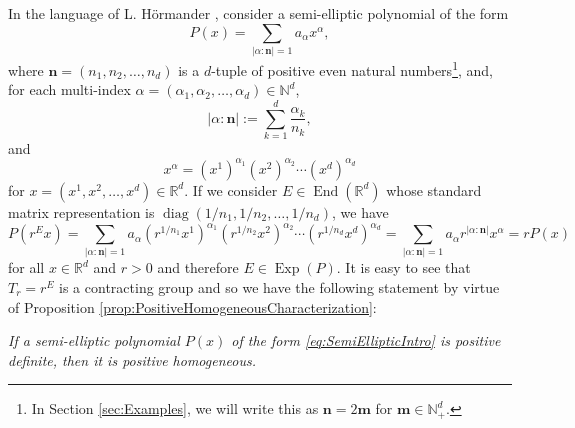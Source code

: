 \documentclass[11pt, letter]{book}
\newenvironment{example}
  {\pushQED{\qed}\renewcommand{\qedsymbol}{$\triangle$}\examplex}
  {\popQED\endexamplex}
\newcommand\End{\operatorname{End}} %
\newcommand\Exp{\operatorname{Exp}}
\newcommand\diag{\operatorname{diag}}
\begin{document}
\begin{example}\label{exp:Polynomial}\normalfont
In the language of L. H\"{o}rmander \cite{hormander_analysis_1983}, consider a semi-elliptic polynomial of the form
\begin{equation}\label{eq:SemiEllipticIntro}
    P(x)=\sum_{|\alpha:\mathbf{n}|=1}a_\alpha x^\alpha,
\end{equation}
where $\mathbf{n}=(n_1,n_2,\dots,n_d)$ is a $d$-tuple of positive even natural numbers\footnote{In Section \ref{sec:Examples}, we will write this as $\mathbf{n}=2\mathbf{m}$ for $\mathbf{m}\in\mathbb{N}_+^d$.}, and, for each multi-index $\alpha =(\alpha_1,\alpha_2,\dots,\alpha_d)\in\mathbb{N}^d$,
\begin{equation*}
    |\alpha:\mathbf{n}|:=\sum_{k=1}^d\frac{\alpha_k}{n_k},
\end{equation*}
and
\begin{equation*}
    x^\alpha=\left(x^1\right)^{\alpha_1}\left(x^2\right)^{\alpha_2}\cdots\left(x^d\right)^{\alpha_d}
\end{equation*}
for $x=\left(x^1,x^2,\dots,x^d\right)\in\mathbb{R}^d$. If we consider $E\in\End(\mathbb{R}^d)$ whose standard matrix representation is $\diag(1/n_1,1/n_2,\dots,1/n_d)$, we have
\begin{equation*}
    P\left(r^Ex\right)=\sum_{|\alpha:\mathbf{n}|=1}a_{\alpha}\left(r^{1/n_1}x^1\right)^{\alpha_1}\left(r^{1/n_2}x^2\right)^{\alpha_2}\cdots\left(r^{1/n_d}x^d\right)^{\alpha_d}=\sum_{|\alpha:\mathbf{n}|=1}a_\alpha r^{|\alpha:\mathbf{n}|}x^\alpha=rP(x)
\end{equation*}
for all $x\in\mathbb{R}^d$ and $r>0$ and therefore $E\in\Exp(P)$. It is easy to see that $T_r=r^E$ is a contracting group and so we have the following statement by virtue of Proposition \ref{prop:PositiveHomogeneousCharacterization}: \begin{center}\textit{If a semi-elliptic polynomial $P(x)$ of the form \eqref{eq:SemiEllipticIntro} is positive definite, then it is positive homogeneous.}
\end{center}


\end{example}
\end{document}
